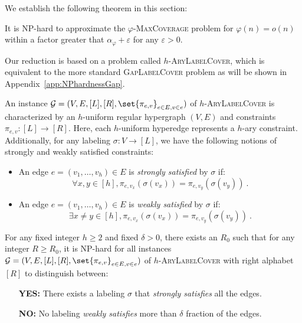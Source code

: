 We establish the following theorem in this section:

\begin{theorem}
 It is NP-hard to approximate the $\varphi$-\textsc{MaxCoverage} problem for $\varphi(n) = o(n)$ within a factor greater that $\alpha_{\varphi} + \varepsilon$ for any $\varepsilon > 0$.
  \label{theo:Hardness}
\end{theorem}

Our reduction is based on a problem called $h$-\textsc{AryLabelCover}, which is equivalent to the more standard \textsc{GapLabelCover} problem as will be shown in Appendix~\ref{app:NPhardnessGap}.
\begin{definition}
  An instance $\mathcal{G} = (V,E,[L],[R],\set{\pi_{e,v}}_{e \in E, v \in e})$ of $h$-\textsc{AryLabelCover} is characterized by an $h$-uniform regular hypergraph $(V, E)$ and constraints $\pi_{e,v} : [L] \rightarrow [R]$. Here, each $h$-uniform hyperedge represents a $h$-ary constraint. Additionally, for any labeling $\sigma : V \rightarrow [L]$, we have the following notions of strongly and weakly satisfied constraints:
  \begin{itemize}
  \item An edge $e = (v_1,\ldots,v_h) \in E$ is \emph{strongly satisfied} by $\sigma$ if:
    \[ \forall x,y \in [h], \pi_{e,v_x}(\sigma(v_x)) = \pi_{e,v_y}(\sigma(v_y))\ . \]
  \item An edge $e = (v_1,\ldots,v_h) \in E$ is \emph{weakly satisfied} by $\sigma$ if:
    \[ \exists x\not=y \in [h], \pi_{e,v_x}(\sigma(v_x)) = \pi_{e,v_y}(\sigma(v_y))\ . \]
  \end{itemize}
\end{definition}

\begin{proposition}
\label{prop:hardness-ary-lc}
  For any fixed integer $h \geq 2$ and fixed $\delta > 0$, there exists an $R_0$ such that for any integer $R \geq R_0$, it is \textrm{NP}-hard for all instances ${\mathcal{G} = (V,E,[L],[R],\set{\pi_{e,v}}_{e \in E, v \in e})}$ of $h$-\textsc{AryLabelCover} with right alphabet $[R]$ to distinguish between: 
  \begin{itemize}
  \item[\textbf{YES:}] There exists a labeling $\sigma$ that \emph{strongly satisfies} all the edges.
  \item[\textbf{NO:}] No labeling \emph{weakly satisfies} more than $\delta$ fraction of the edges.
  \end{itemize}
  \label{prop:AryGapLabelCover}
\end{proposition}


